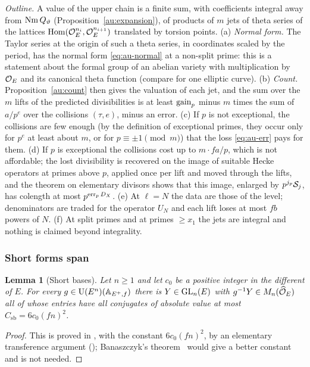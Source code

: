 \documentclass[10pt]{amsart}
\newtheorem{lemma}[theorem]{Lemma}
\theoremstyle{definition}
\theoremstyle{remark}
\begin{document}
\noindent\emph{Outline.} A value of the upper chain is a finite sum, with coefficients integral
away from $\operatorname{Nm} Q_\vartheta$ (Proposition~\ref{au:expansion}), of products of $m$ jets of theta
series of the lattices $\operatorname{Hom}(\mathcal O_E^{n_i},\mathcal O_E^{n_{i+1}})$ translated by torsion points.
(a) \emph{Normal form.} The Taylor series at the origin of such a theta series, in coordinates
scaled by the period, has the normal form \eqref{eq:au-normal} at a non-split prime: this is a
statement about the formal group of an abelian variety with multiplication by $\mathcal O_E$ and its
canonical theta function (compare \cite{BannaiKobayashi}
for one elliptic curve). (b) \emph{Count.} Proposition~\ref{au:count} then gives the valuation of
each jet, and the sum over the $m$ lifts of the predicted divisibilities is at least
$\operatorname{gain}_p$ minus $m$ times the sum of $a/p^e$ over the collisions $(\tau,e)$, minus an error.
(c) If $p$ is not exceptional, the collisions are few enough (by the definition of exceptional primes,
they occur only for $p^e$ at least about $m$, or for $p\equiv\pm1\pmod m$) that the loss
\eqref{eq:au-err} pays for them. (d) If $p$ is exceptional the
collisions cost up to $m\cdot fa/p$, which is not affordable; the lost divisibility is recovered on
the image of suitable Hecke operators at primes above $p$, applied once per lift and moved through
the lifts, and the theorem on elementary divisors shows that this image, enlarged by
$p^{j_p}\mathcal S_j$, has colength at most $p^{\operatorname{err}_pD_X}$. (e) At $\ell=N$ the data are those of
the level; denominators are traded for the operator $U_N$ and each lift loses at most $fb$ powers
of $N$. (f) At split primes and at primes $\ge x_1$ the jets are integral and nothing is claimed
beyond integrality.

\subsubsection*{Short forms span}

\begin{lemma}[Short bases]\label{au:shortbasis}
Let $n\ge1$ and let $c_0$ be a positive integer in the different of $E$. For every
$g\in\mathrm U(E^n)(\mathbb A_{E^+,f})$ there is $Y\in\mathrm{GL}_n(E)$ with $g^{-1}Y\in M_n(\widehat{\mathcal O}_E)$
all of whose entries have all conjugates of absolute value at most $C_{\mathrm{sb}}=6c_0(fn)^2$.
\end{lemma}
\begin{proof}
This is proved in {\cite[\S5.1.2]{P49}}, with the constant $6c_0(fn)^2$, by an elementary
transference argument ({\cite[Lemma~5.4]{P49}}); Banaszczyk's theorem~\cite[Theorem~2.1]{Banaszczyk} would give
a better constant and is not needed.
\end{proof}
\end{document}
